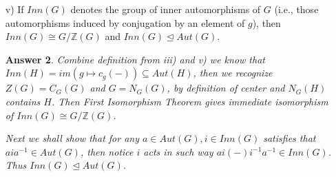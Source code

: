 \documentclass[11pt,leqno]{article}
\newcommand{\Z}{{\mathbb Z}}
\newcommand{\<}[1]{{\langle}#1 {\rangle}}
\theoremstyle{plain}
\newtheorem*{answer*}{Answer}
\theoremstyle{definition}
\theoremstyle{remark}
\numberwithin{equation}{section}
\begin{document}
\begin{enumerate}
\begin{itemize}
\begin{answer*}
        Induced map is descended from the map in iii) thus automatically a homomorphism, the injectivity follows from $ker(N_G(H)/C_G(H) \to Aut(H))={e}=ker(g \mapsto c_g(-))/C_G(H)$.
        \end{answer*}
    \item[v)] If $Inn(G)$ denotes the group of inner automorphisms of $G$ (i.e., those automorphisms induced by conjugation by an element of $g$), then $Inn(G) \cong G/\Z(G)$ and $Inn(G) \trianglelefteq Aut(G)$.
        \begin{answer*}
        Combine definition from iii) and v) we know that $Inn(H)=im(g \mapsto c_g(-))\subseteq Aut(H)$, then we recognize $Z(G)= C_G(G)$ and $G=N_G(G)$, by definition of center and $N_G(H)$ contains $H$. Then First Isomorphism Theorem gives immediate isomorphism of $Inn(G)\cong G/\Z(G)$. 
        
        Next we shall show that for any $a \in Aut(G), i\in Inn(G)$ satisfies that $aia^{-1}\in Aut(G)$, then notice $i$ acts in such way $ai(-)i^{-1}a^{-1} \in Inn(G)$. Thus $Inn(G) \trianglelefteq Aut(G)$.  
        \end{answer*}
    \end{itemize}
    

\end{enumerate}
\end{document}
